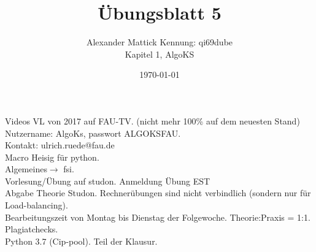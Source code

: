 \documentclass{article}
\title{Übungsblatt 5}
\author{
Alexander Mattick Kennung: qi69dube\\
Kapitel 1, AlgoKS
}
\date{\today}
\begin{document}
	\maketitle
	Videos VL von 2017 auf FAU-TV. (nicht mehr 100\% auf dem neuesten Stand)\\
	Nutzername: AlgoKs, passwort ALGOKSFAU.\\
	Kontakt: ulrich.ruede@fau.de\\
	Macro Heisig für python.\\
	Algemeines$\to$ fsi.\\
	Vorlesung/Übung auf studon. Anmeldung Übung EST\\
	Abgabe Theorie Studon. Rechnerübungen sind nicht verbindlich (sondern nur für Load-balancing).\\
	Bearbeitungszeit von Montag bis Dienstag der Folgewoche. Theorie:Praxis = 1:1.\\
	Plagiatchecks.\\
	Python 3.7 (Cip-pool). Teil der Klausur.\\
	
\end{document}
